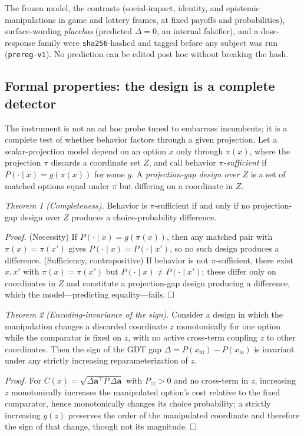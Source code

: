 \documentclass[journal]{IEEEtran}
\begin{document}
The frozen model, the contrasts (social-impact, identity, and epistemic manipulations in game and lottery frames, at fixed payoffs and probabilities), surface-wording \emph{placebos} (predicted $\Delta=0$, an internal falsifier), and a dose-response family were \texttt{sha256}-hashed and tagged before any subject was run (\texttt{prereg-v1}).
No prediction can be edited post hoc without breaking the hash.

\subsection{Formal properties: the design is a complete detector}
The instrument is not an ad hoc probe tuned to embarrass incumbents; it is a complete test of whether behavior factors through a given projection.
Let a scalar-projection model depend on an option $x$ only through $\pi(x)$, where the projection $\pi$ discards a coordinate set $Z$, and call behavior \emph{$\pi$-sufficient} if $P(\cdot\mid x)=g(\pi(x))$ for some $g$.
A \emph{projection-gap design over $Z$} is a set of matched options equal under $\pi$ but differing on a coordinate in $Z$.

\emph{Theorem 1 (Completeness).}
Behavior is $\pi$-sufficient if and only if no projection-gap design over $Z$ produces a choice-probability difference.

\emph{Proof.}
(Necessity) If $P(\cdot\mid x)=g(\pi(x))$, then any matched pair with $\pi(x)=\pi(x')$ gives $P(\cdot\mid x)=P(\cdot\mid x')$, so no such design produces a difference.
(Sufficiency, contrapositive) If behavior is not $\pi$-sufficient, there exist $x,x'$ with $\pi(x)=\pi(x')$ but $P(\cdot\mid x)\neq P(\cdot\mid x')$; these differ only on coordinates in $Z$ and constitute a projection-gap design producing a difference, which the model---predicting equality---fails. $\hfill\square$

\emph{Theorem 2 (Encoding-invariance of the sign).}
Consider a design in which the manipulation changes a discarded coordinate $z$ monotonically for one option while the comparator is fixed on $z$, with no active cross-term coupling $z$ to other coordinates.
Then the sign of the GDT gap $\Delta=P(x_{\text{hi}})-P(x_{\text{lo}})$ is invariant under any strictly increasing reparameterization of $z$.

\emph{Proof.}
For $C(x)=\sqrt{\Delta\mathbf{a}^{\top}P\,\Delta\mathbf{a}}$ with $P_{zz}>0$ and no cross-term in $z$, increasing $z$ monotonically increases the manipulated option's cost relative to the fixed comparator, hence monotonically changes its choice probability; a strictly increasing $g(z)$ preserves the order of the manipulated coordinate and therefore the sign of that change, though not its magnitude. $\hfill\square$
\end{document}
